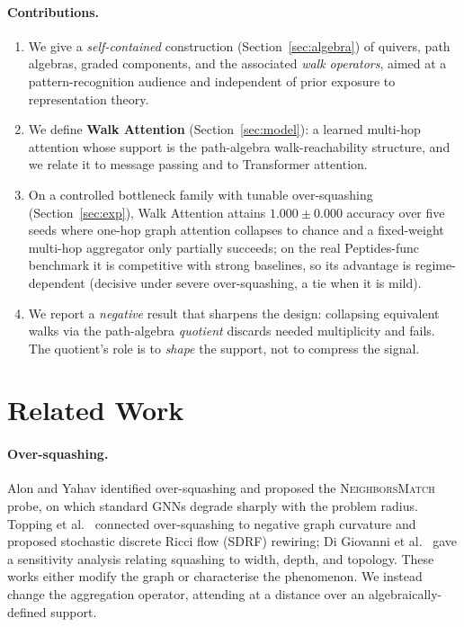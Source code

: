 \documentclass[runningheads]{llncs}
\begin{document}
\paragraph{Contributions.}
\begin{enumerate}
  \item We give a \emph{self-contained} construction (Section~\ref{sec:algebra})
  of quivers, path algebras, graded components, and the associated \emph{walk
  operators}, aimed at a pattern-recognition audience and independent of prior
  exposure to representation theory.
  \item We define \textbf{Walk Attention} (Section~\ref{sec:model}): a learned
  multi-hop attention whose support is the path-algebra walk-reachability
  structure, and we relate it to message passing and to Transformer attention.
  \item On a controlled bottleneck family with tunable over-squashing
  (Section~\ref{sec:exp}), Walk Attention attains $1.000\pm0.000$ accuracy over
  five seeds where one-hop graph attention collapses to chance and a fixed-weight
  multi-hop aggregator only partially succeeds; on the real Peptides-func
  benchmark it is competitive with strong baselines, so its advantage is
  regime-dependent (decisive under severe over-squashing, a tie when it is mild).
  \item We report a \emph{negative} result that sharpens the design: collapsing
  equivalent walks via the path-algebra \emph{quotient} discards needed
  multiplicity and fails. The quotient's role is to \emph{shape} the support, not
  to compress the signal.
\end{enumerate}

\section{Related Work}\label{sec:related}

\paragraph{Over-squashing.}
Alon and Yahav \cite{alon2021bottleneck} identified over-squashing and proposed
the \textsc{NeighborsMatch} probe, on which standard GNNs degrade sharply with
the problem radius. Topping et al.\ \cite{topping2022understanding} connected
over-squashing to negative graph curvature and proposed stochastic discrete
Ricci flow (SDRF) rewiring; Di Giovanni et al.\
\cite{digiovanni2023oversquashing} gave a sensitivity analysis relating
squashing to width, depth, and topology. These works either modify the graph or
characterise the phenomenon. We instead change the aggregation operator,
attending at a distance over an algebraically-defined support.
\end{document}
